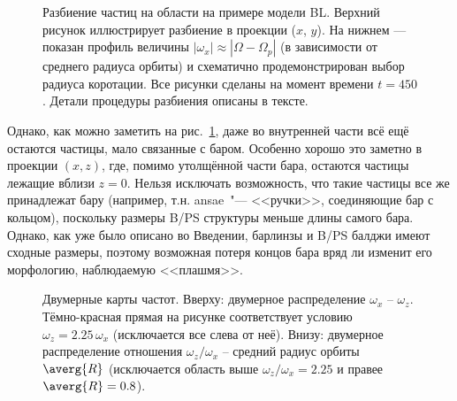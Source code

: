 \documentclass[tikz]{trlnotes}
\begin{document}
\begin{figure}[htpb]
  \centering
  \par
  \caption{Разбиение частиц на области на примере модели BL.
    Верхний рисунок иллюстрирует разбиение в проекции ($x$, $y$).
    На нижнем --- показан профиль величины $|ω_x| \approx |Ω - Ω_p|$ (в зависимости от среднего радиуса орбиты) и схематично продемонстрирован выбор радиуса коротации. Все рисунки сделаны на момент времени $t=450$.
Детали процедуры разбиения описаны в тексте.}%
  \label{fig:disksplit}
\end{figure}

Однако, как можно заметить на рис.~\ref{fig:disksplit}, даже во внутренней части всё ещё остаются частицы, мало
связанные с баром. Особенно хорошо это заметно в проекции $(x, z)$, где, помимо утолщённой части бара, остаются
частицы лежащие вблизи $z=0$. Нельзя исключать возможность, что такие частицы все же принадлежат бару (например, т.н.
ansae~"--- <<ручки>>, соединяющие бар с кольцом), поскольку размеры B/PS структуры меньше длины самого бара. Однако, как
уже было описано во Введении, барлинзы и B/PS балджи имеют сходные размеры, поэтому возможная потеря концов бара
вряд ли изменит его морфологию, наблюдаемую <<плашмя>>. 

\begin{figure}[htpb]
  \centering
  \caption{Двумерные карты частот. Вверху: двумерное распределение
    $ω_x$ -- $ω_z$. Тёмно-красная прямая на рисунке соответствует условию
    $ω_z = 2.25\, ω_x$ (исключается все слева от неё). Внизу: двумерное
    распределение отношения $ω_z/ω_x$ -- средний радиус
  орбиты $\averg{R}$ (исключается область выше $ω_z/ω_x = 2.25$ и правее $\averg{R} = 0.8$).}
  \label{fig:innerrefine}
\end{figure}
\end{document}
